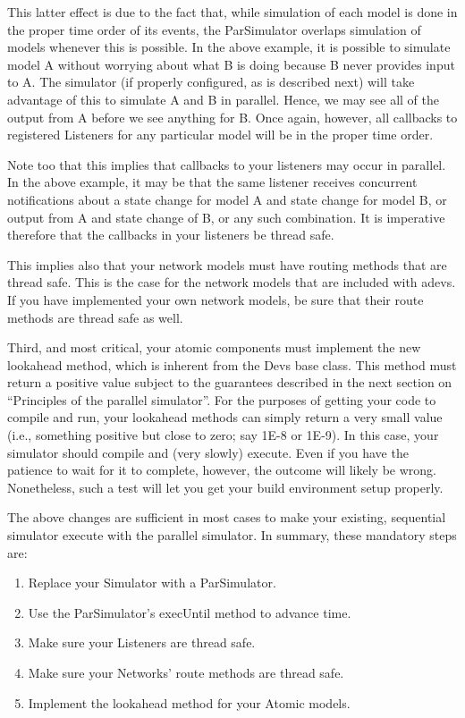 This latter effect is due to the fact that, while simulation of each model is done in the proper time order of its events, the ParSimulator overlaps simulation of models whenever this is possible. In the above example, it is possible to simulate model A without worrying about what B is doing because B never provides input to A. The simulator (if properly configured, as is described next) will take advantage of this to simulate A and B in parallel. Hence, we may see all of the output from A before we see anything for B. Once again, however, all callbacks to registered Listeners for any particular model will be in the proper time order.

Note too that this implies that callbacks to your listeners may occur in parallel. In the above example, it may be that the same listener receives concurrent notifications about a state change for model A and state change for model B, or output from A and state change of B, or any such combination. It is imperative therefore that the callbacks in your listeners be thread safe.

This implies also that your network models must have routing methods that are thread safe. This is the case for the network models that are included with adevs. If you have implemented your own network models, be sure that their route methods are thread safe as well.

Third, and most critical, your atomic components must implement the new lookahead method, which is inherent from the Devs base class. This method must return a positive value subject to the guarantees described in the next section on ``Principles of the parallel simulator''. For the purposes of getting your code to compile and run, your lookahead methods can simply return a very small value (i.e., something positive but close to zero; say 1E-8 or 1E-9). In this case, your simulator should compile and (very slowly) execute. Even if you have the patience to wait for it to complete, however, the outcome will likely be wrong. Nonetheless, such a test will let you get your build environment setup properly.

The above changes are sufficient in most cases to make your existing, sequential simulator execute with the parallel simulator. In summary, these mandatory steps are:
\begin{enumerate}
\item Replace your Simulator with a ParSimulator.
\item Use the ParSimulator's execUntil method to advance time.
\item Make sure your Listeners are thread safe.
\item Make sure your Networks' route methods are thread safe.
\item Implement the lookahead method for your Atomic models.
\end{enumerate}

